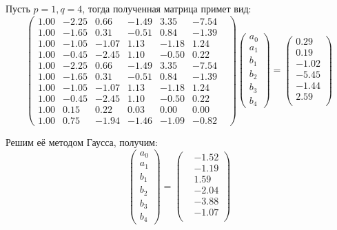 \documentclass[a4paper, fontsize=14pt]{article}
\begin{document}
Пусть $p = 1, q = 4$, тогда полученная матрица примет вид:
\begin{equation*}
    \begin{pmatrix}
        1.00&  -2.25&   0.66&  -1.49&   3.35&  -7.54& \\
        1.00&  -1.65&   0.31&  -0.51&   0.84&  -1.39& \\
        1.00&  -1.05&  -1.07&   1.13&  -1.18&   1.24& \\
        1.00&  -0.45&  -2.45&   1.10&  -0.50&   0.22& \\
        1.00&  -2.25&   0.66&  -1.49&   3.35&  -7.54& \\ 
        1.00&  -1.65&   0.31&  -0.51&   0.84&  -1.39& \\           
        1.00&  -1.05&  -1.07&   1.13&  -1.18&   1.24& \\           
        1.00&  -0.45&  -2.45&   1.10&  -0.50&   0.22& \\                    
        1.00&   0.15&   0.22&   0.03&   0.00&   0.00& \\                                   
        1.00&   0.75&  -1.94&  -1.46&  -1.09&  -0.82&
    \end{pmatrix}
    \begin{pmatrix}
        a_0 \\
        a_1 \\
        b_1 \\
        b_2 \\
        b_3 \\
        b_4 
    \end{pmatrix}   
    =
    \begin{pmatrix}
        0.29\\  0.19\\ -1.02\\ -5.45\\ -1.44\\  2.59\\
    \end{pmatrix}      
\end{equation*}

Решим её методом Гаусса, получим:
\begin{equation*}
    \begin{pmatrix}
        a_0 \\
        a_1 \\
        b_1 \\
        b_2 \\
        b_3 \\
        b_4 
    \end{pmatrix} =
    \begin{pmatrix}
        &-1.52\\ &-1.19\\  &1.59\\ &-2.04\\ &-3.88\\ &-1.07\\
    \end{pmatrix} 
\end{equation*}
\end{document}
